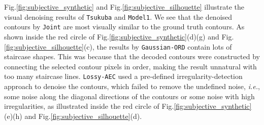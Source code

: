Fig.\;\ref{fig:subjective_synthetic} and Fig.\;\ref{fig:subjective_silhouette} illustrate the visual denoising results of \texttt{Tsukuba} and \texttt{Model1}.
We see that the denoised contours by \texttt{Joint} are most visually similar to the ground truth contours.
As shown inside the red circle of Fig.\;\ref{fig:subjective_synthetic}(d)\;(g) and Fig.\;\ref{fig:subjective_silhouette}(c), the results by \texttt{Gaussian-ORD} contain lots of staircase shapes.
This was because that the decoded contours were constructed by connecting the selected contour pixels in order, making the result unnatural with too many staircase lines.
\texttt{Lossy-AEC} used a pre-defined irregularity-detection approach to denoise the contours, which failed to remove the undefined noise, \textit{i.e.}, some noise along the diagonal directions of the contours or some noise with high irregularities, as illustrated inside the red circle of Fig.\;\ref{fig:subjective_synthetic}(e)\;(h) and Fig.\;\ref{fig:subjective_silhouette}(d).  
